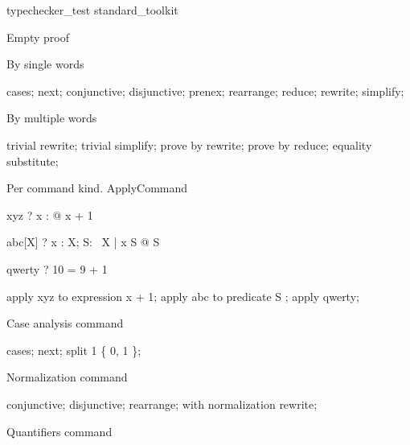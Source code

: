 \begin{zsection}
   \SECTION typechecker\_test \parents standard\_toolkit
\end{zsection}

Empty proof

\begin{zproof}[emptyProof]
\end{zproof}


By single words

\begin{zproof}[singleWord]
cases;
next;
conjunctive;
disjunctive;
prenex;
rearrange;
reduce;
rewrite;
simplify;
\end{zproof}

By multiple words

\begin{zproof}[multipleWords]
trivial rewrite;
trivial simplify;
prove by rewrite;
prove by reduce;
equality substitute;
\end{zproof}

Per command kind. ApplyCommand

\begin{theorem}{xyz}
\vdash? \forall x : \nat @ x + 1 \in \nat
\end{theorem}

\begin{theorem}{abc}[X]
\vdash? \forall x : X; S: \power~X | x \in S @ S \neq \emptyset
\end{theorem}

\begin{theorem}{qwerty}
\vdash? 10 = 9 + 1
\end{theorem}

\begin{zproof}[applyWordComplex]
apply xyz to expression x + 1;
apply abc to predicate S \neq \emptyset;
apply qwerty;
\end{zproof}

Case analysis command

\begin{zproof}[caseAnalysisCmd]
cases;
next;
split 1 \in \{ 0, 1 \};
\end{zproof}

Normalization command

\begin{zproof}[normCmd]
conjunctive;    %
disjunctive;
rearrange;
with normalization rewrite;
\end{zproof}

Quantifiers command

